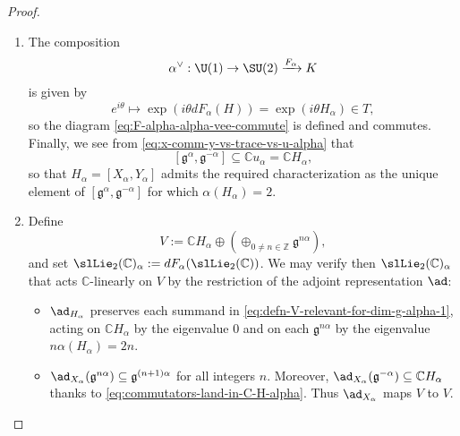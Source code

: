 \documentclass[reqno]{amsart} 
\begin{document}
\begin{proof}
\begin{enumerate}
    This completes the proof that the linear map ``$d F_\alpha$'' defines a $\theta$-equivariant $\mathbb{C}$-linear Lie algebra morphism $\slLie_2(\mathbb{C}) \rightarrow \mathfrak{g}$.  By passage to $\theta$-fixed subspaces, we obtain a Lie algebra morphism $\su(2) \rightarrow \mathfrak{k}$.  Since $\SU(2)$ is simply-connected, this lifts to a Lie group morphism $F_\alpha : K \rightarrow \SU(2)$, whose differential $d F_\alpha$ is the map ``$d F_\alpha$'' that we constructed.
  \item The composition
    \begin{equation}\label{eq:}
      \alpha^\vee : \U(1) \rightarrow \SU(2)
      \xrightarrow{F_\alpha } K
    \end{equation}
    is given by
    \begin{equation}\label{eq:}
      e^{i \theta}
      \mapsto
      \exp (i \theta d F_\alpha(H))
      =
      \exp(i \theta H_\alpha)
      \in T,
    \end{equation}
    so the diagram \eqref{eq:F-alpha-alpha-vee-commute} is defined and commutes.  Finally, we see from \eqref{eq:x-comm-y-vs-trace-vs-u-alpha} that
    \begin{equation}\label{eq:commutators-land-in-C-H-alpha}
      [\mathfrak{g}^\alpha, \mathfrak{g}^{-\alpha}]
      \subseteq \mathbb{C} u_\alpha
      = \mathbb{C} H_\alpha,
    \end{equation}
    so that $H_\alpha = [X_\alpha, Y_\alpha]$ admits the required characterization as the unique element of $[\mathfrak{g}^\alpha, \mathfrak{g}^{-\alpha}]$ for which $\alpha(H_\alpha) = 2$.
  \item Define
    \begin{equation}\label{eq:defn-V-relevant-for-dim-g-alpha-1}
      V := \mathbb{C} H_\alpha \oplus (\oplus_{0 \neq n \in
        \mathbb{Z} }
      \mathfrak{g}^{n \alpha}),
    \end{equation}
    and set $\slLie_2(\mathbb{C})_\alpha := d F_\alpha(\slLie_2(\mathbb{C}))$.  We may verify then $\slLie_2(\mathbb{C})_\alpha$ that acts $\mathbb{C}$-linearly on $V$ by the restriction of the adjoint representation $\ad$:
    \begin{itemize}
    \item $\ad_{H_\alpha}$ preserves each summand in \eqref{eq:defn-V-relevant-for-dim-g-alpha-1}, acting on $\mathbb{C} H_\alpha$ by the eigenvalue $0$ and on each $\mathfrak{g}^{n \alpha}$ by the eigenvalue $n \alpha(H_\alpha) = 2 n$.
    \item $\ad_{X_\alpha}(\mathfrak{g}^{n \alpha}) \subseteq \mathfrak{g}^{(n+1) \alpha}$ for all integers $n$.  Moreover, $\ad_{X_\alpha}(\mathfrak{g}^{-\alpha}) \subseteq \mathbb{C} H_\alpha$ thanks to \eqref{eq:commutators-land-in-C-H-alpha}.  Thus $\ad_{X_\alpha}$ maps $V$ to $V$.

\end{itemize}
\end{enumerate}
\end{proof}
\end{document}
